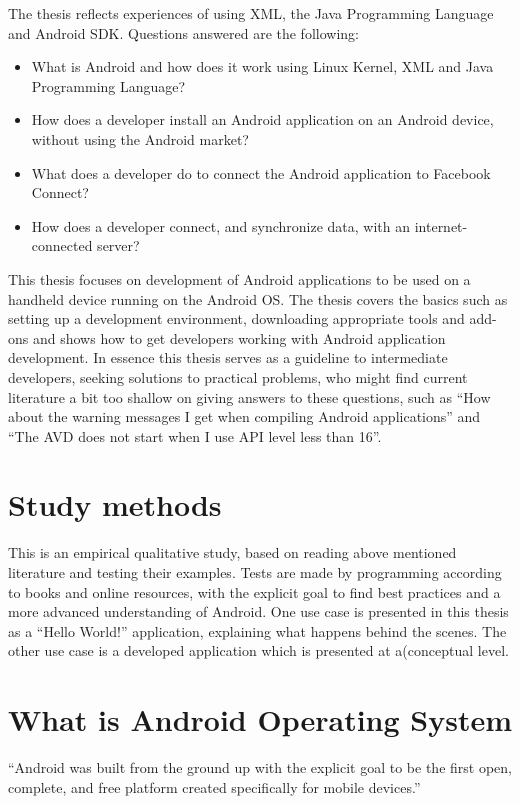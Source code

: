 \noindent
The thesis reflects experiences of using XML, the Java Programming Language and Android SDK. Questions answered are the following:
\begin{itemize}
\item {What is Android and how does it work using Linux Kernel, XML and Java Programming Language? }
\item {How does a developer install an Android application on an Android device, without using the Android market? }
\item {What does a developer do to connect the Android application to Facebook Connect? }
\item {How does a developer connect, and synchronize data, with an internet-connected server? }
\end{itemize}

\noindent
This thesis focuses on development of Android applications to be used on a handheld device running on the Android OS. The thesis covers the basics such as setting up a development environment, downloading appropriate tools and add-ons and shows how to get developers working with Android application development. In essence this thesis serves as a guideline to intermediate developers, seeking solutions to practical problems, who might find current literature a bit too shallow on giving answers to these questions, such as “How about the warning messages I get when compiling Android applications” and “The AVD does not start when I use API level less than 16”.

\section{Study methods}
This is an empirical qualitative study, based on reading above mentioned literature and testing their examples. Tests are made by programming according to books and online resources, with the explicit goal to find best practices and a more advanced understanding of Android. One use case is presented in this thesis as a “Hello World!” application, explaining what happens behind the scenes. The other use case is a developed application which is presented at a(conceptual level.
\section{What is Android Operating System}
“Android was built from the ground up with the explicit goal to be the first open, complete, and free platform created specifically for mobile devices.”\\


